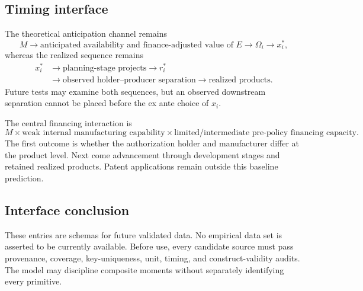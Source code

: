 \subsection{Timing interface}
\label{subsec:p10-timing}

The theoretical anticipation channel remains
\begin{equation}
  M
  \longrightarrow
  \text{anticipated availability and finance-adjusted value of }E
  \longrightarrow
  \Omega_i
  \longrightarrow
  x_i^*,
  \label{eq:p10-anticipated-interface}
\end{equation}
whereas the realized sequence remains
\begin{equation}
  \begin{aligned}
  x_i^*
  &\longrightarrow
  \text{planning-stage projects}
  \longrightarrow r_i^* \\
  &\longrightarrow
  \text{observed holder--producer separation}
  \longrightarrow
  \text{realized products}.
  \end{aligned}
  \label{eq:p10-realized-interface}
\end{equation}
Future tests may examine both sequences, but an observed downstream separation
cannot be placed before the ex ante choice of \(x_i\).

The central financing interaction is
\[
  M
  \times
  \text{weak internal manufacturing capability}
  \times
  \text{limited/intermediate pre-policy financing capacity}.
\]
The first outcome is whether the authorization holder and manufacturer differ
at the product level. Next come advancement through development stages and
retained realized products.
Patent applications remain outside this baseline prediction.

\subsection{Interface conclusion}
\label{subsec:p10-conclusion}

These entries are schemas for future validated data. No empirical data set is
asserted to be currently available. Before use, every candidate source must pass provenance,
coverage, key-uniqueness, unit, timing, and construct-validity audits. The
model may discipline composite moments without separately identifying every
primitive.
